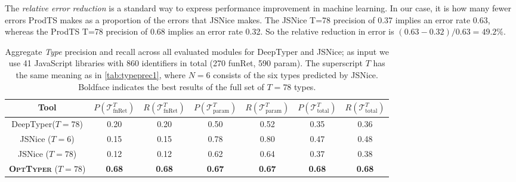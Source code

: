 \documentclass[sigplan,10pt,review,anonymous]{acmart} %
\newcommand{\projectname}{\textsc{OptTyper}\xspace}
\theoremstyle{plain}
\theoremstyle{remark}
\theoremstyle{definition}
\begin{document}
The \emph{relative error reduction} is a standard way to express performance improvement in machine learning.
In our case, it is how many fewer errors ProdTS makes as a proportion of the errors that JSNice makes.
The JSNice T=78 precision of 0.37 implies an error rate 0.63,
whereas the ProdTS T=78 precision of 0.68 implies an error rate 0.32.
So the relative reduction in error is $(0.63-0.32) / 0.63 = 49.2\%$.

\begin{table*}[t]
	\centering
	\caption{Aggregate \textit{Type} precision and recall across all evaluated modules for DeepTyper and JSNice; as input we use 41 JavaScript libraries with 860 identifiers in total (270 funRet, 590 param).
		The superscript $T$ has the same meaning as in \cref{tab:typeprec1}, where $N = 6$ consists of the six types predicted by JSNice.
		Boldface indicates the best results of the full set of $T=78$ types.}\label{tab:typeprec2}
	\begin{tabular}{ccccccc}
		\toprule
		Tool                                  & $P(\mathcal{T}^T_\text{fnRet})$ & $R(\mathcal{T}^T_\text{fnRet})$ & $P(\mathcal{T}^T_\text{param})$ & $R(\mathcal{T}^T_\text{param})$ & $P(\mathcal{T}^T_\text{total})$ & $R(\mathcal{T}^T_\text{total})$ \\
		\midrule
		DeepTyper\tiny{($T=78$)}              & 0.20                  & 0.20                  & 0.50                  & 0.52                  & 0.35                  & 0.36                  \\

		JSNice \tiny{($T=6$)}                 & 0.15                  & 0.15                  & 0.78                  & 0.80                  & 0.47                  & 0.48                  \\
		JSNice \tiny{($T=78$)}                & 0.12                  & 0.12                  & 0.62                  & 0.64                  & 0.37                  & 0.38                  \\
		\textbf{\projectname} \tiny{($T=78$)} & \textbf{0.68}         & \textbf{0.68}         & \textbf{0.67}         & \textbf{0.67}
		                                      & \textbf{0.68}         & \textbf{0.68}                                                                                                         \\
		\bottomrule
	\end{tabular}
\end{table*}
\end{document}
